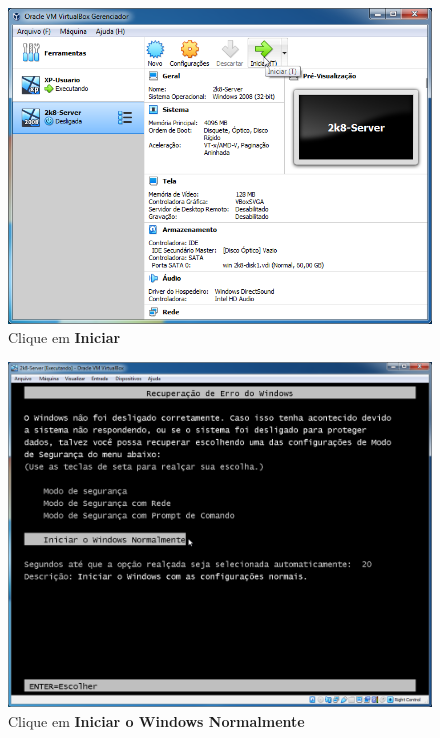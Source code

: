 \documentclass[10pt]{article}
\begin{document}
\begin{figure}[H]
    \centering
    \caption{Clique em \textbf{Iniciar}}
    \label{fig:3124}
    \includegraphics[width=\linewidth]{images/ativacao_das_maquinas_virtuais/configuracao_inicial_das_maquinas_virtuais/024.png}
\end{figure}
\begin{figure}[H]
    \centering
    \caption{Clique em \textbf{Iniciar o Windows Normalmente}}
    \label{fig:3125}
    \includegraphics[width=\linewidth]{images/ativacao_das_maquinas_virtuais/configuracao_inicial_das_maquinas_virtuais/025.png}
\end{figure}
\end{document}
